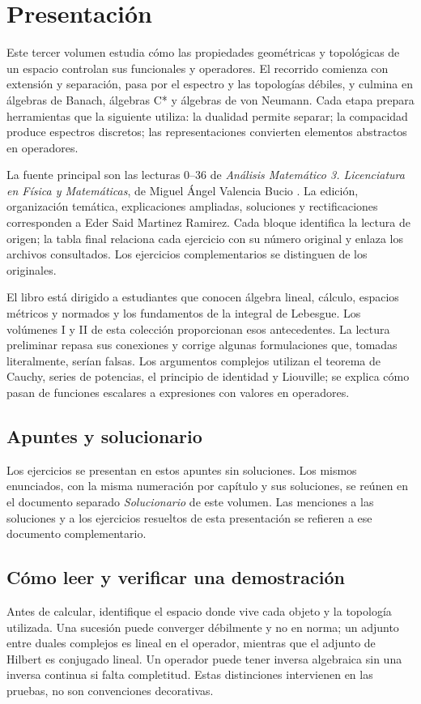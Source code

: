 \chapter*{Presentación}
Este tercer volumen estudia cómo las propiedades geométricas y topológicas de un espacio controlan sus funcionales y operadores. El recorrido comienza con extensión y separación, pasa por el espectro y las topologías débiles, y culmina en álgebras de Banach, álgebras C* y álgebras de von Neumann. Cada etapa prepara herramientas que la siguiente utiliza: la dualidad permite separar; la compacidad produce espectros discretos; las representaciones convierten elementos abstractos en operadores.

La fuente principal son las lecturas 0--36 de \emph{Análisis Matemático 3. Licenciatura en Física y Matemáticas}, de Miguel Ángel Valencia Bucio \cite{valencia3}. La edición, organización temática, explicaciones ampliadas, soluciones y rectificaciones corresponden a Eder Said Martinez Ramirez. Cada bloque identifica la lectura de origen; la tabla final relaciona cada ejercicio con su número original y enlaza los archivos consultados. Los ejercicios complementarios se distinguen de los originales.

El libro está dirigido a estudiantes que conocen álgebra lineal, cálculo, espacios métricos y normados y los fundamentos de la integral de Lebesgue. Los volúmenes I y II de esta colección proporcionan esos antecedentes. La lectura preliminar repasa sus conexiones y corrige algunas formulaciones que, tomadas literalmente, serían falsas. Los argumentos complejos utilizan el teorema de Cauchy, series de potencias, el principio de identidad y Liouville; se explica cómo pasan de funciones escalares a expresiones con valores en operadores.

\section*{Apuntes y solucionario}
Los ejercicios se presentan en estos apuntes sin soluciones. Los mismos
enunciados, con la misma numeración por capítulo y sus soluciones, se reúnen
en el documento separado \emph{Solucionario} de este volumen. Las menciones
a las soluciones y a los ejercicios resueltos de esta presentación se refieren
a ese documento complementario.

\section*{Cómo leer y verificar una demostración}
Antes de calcular, identifique el espacio donde vive cada objeto y la topología utilizada. Una sucesión puede converger débilmente y no en norma; un adjunto entre duales complejos es lineal en el operador, mientras que el adjunto de Hilbert es conjugado lineal. Un operador puede tener inversa algebraica sin una inversa continua si falta completitud. Estas distinciones intervienen en las pruebas, no son convenciones decorativas.

